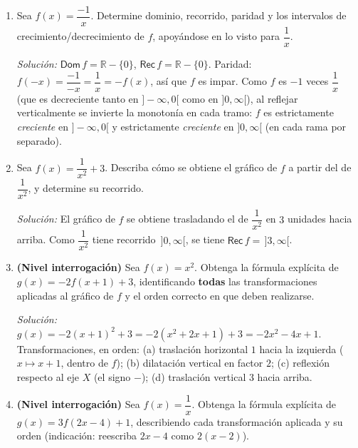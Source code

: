 \documentclass[11pt]{article}
\begin{document}
\begin{enumerate}[label=\arabic*.]
\textit{Solución:} \textbf{Signo:} $f(x)>0$ para todo $x\in\,]-\infty,0[$, pues $x^2>0$ cuando
$x\neq0$. \textbf{Paridad:} $f(-x) = \dfrac{1}{(-x)^2} = \dfrac{1}{x^2} = f(x)$, así que $f$ es
par; el comportamiento en $]-\infty,0[$ es el reflejo especular (respecto al eje $Y$) del
comportamiento en $]0,\infty[$. \textbf{Monotonía:} en $]-\infty,0[$, $f$ es estrictamente
\emph{creciente}: cuando $x\to-\infty$, $f(x)\to0^+$, y cuando $x\to0^-$, $f(x)\to+\infty$; es
decir, a medida que $x$ aumenta (se acerca a $0$ por la izquierda), $f(x)$ aumenta.

\item Sea $f(x) = \dfrac{-1}{x}$. Determine dominio, recorrido, paridad y los
intervalos de crecimiento/decrecimiento de $f$, apoyándose en lo visto para
$\dfrac{1}{x}$.

\textit{Solución:} $\mathsf{Dom}\,f=\mathbb{R}-\{0\}$, $\mathsf{Rec}\,f=\mathbb{R}-\{0\}$.
Paridad: $f(-x) = \dfrac{-1}{-x} = \dfrac{1}{x} = -f(x)$, así que $f$ es impar. Como $f$ es
$-1$ veces $\dfrac1x$ (que es decreciente tanto en $]-\infty,0[$ como en $]0,\infty[$), al
reflejar verticalmente se invierte la monotonía en cada tramo: $f$ es estrictamente
\emph{creciente} en $]-\infty,0[$ y estrictamente \emph{creciente} en $]0,\infty[$ (en cada rama
por separado).

\item Sea $f(x) = \dfrac{1}{x^2} + 3$. Describa cómo se obtiene el gráfico de
$f$ a partir del de $\dfrac{1}{x^2}$, y determine su recorrido.

\textit{Solución:} El gráfico de $f$ se obtiene trasladando el de $\dfrac{1}{x^2}$ en $3$
unidades hacia arriba. Como $\dfrac{1}{x^2}$ tiene recorrido $\,]0,\infty[$, se tiene
$\mathsf{Rec}\,f = \,]3,\infty[$.

\item \textbf{(Nivel interrogación)} Sea $f(x) = x^2$. Obtenga la fórmula explícita de
$g(x) = -2f(x+1) + 3$, identificando \textbf{todas} las transformaciones aplicadas al gráfico de
$f$ y el orden correcto en que deben realizarse.

\textit{Solución:} $g(x) = -2(x+1)^2+3 = -2(x^2+2x+1)+3 = -2x^2-4x+1$. Transformaciones, en
orden: (a) traslación horizontal $1$ hacia la izquierda ($x\mapsto x+1$, dentro de $f$); (b)
dilatación vertical en factor $2$; (c) reflexión respecto al eje $X$ (el signo $-$); (d)
traslación vertical $3$ hacia arriba.

\item \textbf{(Nivel interrogación)} Sea $f(x) = \dfrac{1}{x}$. Obtenga la fórmula explícita de
$g(x) = 3f(2x-4) + 1$, describiendo cada transformación aplicada y su orden (indicación: reescriba
$2x-4$ como $2(x-2)$).


\end{enumerate}
\end{document}
